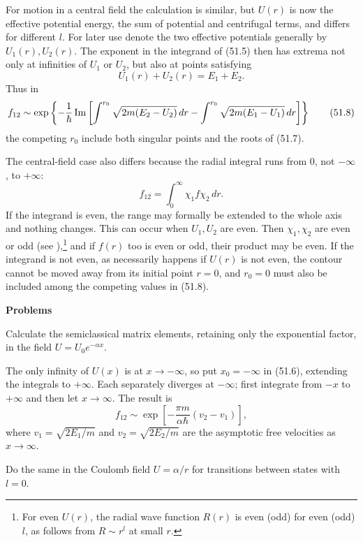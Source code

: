For motion in a central field the calculation is similar, but $U(r)$ is now
the effective potential energy, the sum of potential and centrifugal terms,
and differs for different $l$. For later use denote the two effective
potentials generally by $U_1(r),U_2(r)$. The exponent in the integrand of
(51.5) then has extrema not only at infinities of $U_1$ or $U_2$, but also at
points satisfying
\begin{equation}
 U_1(r)+U_2(r)=E_1+E_2. \tag{51.7}
\end{equation}
Thus in
\begin{equation}
 f_{12}\sim\exp\left\{-\frac1\hbar\mathop{\rm Im}\left[
 \int^{r_0}\sqrt{2m(E_2-U_2)}\,dr-
 \int^{r_0}\sqrt{2m(E_1-U_1)}\,dr\right]\right\} \tag{51.8}
\end{equation}
the competing $r_0$ include both singular points and the roots of (51.7).

The central-field case also differs because the radial integral runs from 0,
not $-\infty$, to $+\infty$:
\[
 f_{12}=\int_0^\infty\chi_1f\chi_2\,dr.
\]
If the integrand is even, the range may formally be extended to the whole
axis and nothing changes. This can occur when $U_1,U_2$ are even. Then
$\chi_1,\chi_2$ are even or odd (see ),\footnote{For even $U(r)$, the
radial wave function $R(r)$ is even (odd) for even (odd) $l$, as follows from
$R\sim r^l$ at small $r$.} and if $f(r)$ too is even or odd, their product may
be even. If the integrand is not even, as necessarily happens if $U(r)$ is
not even, the contour cannot be moved away from its initial point $r=0$, and
$r_0=0$ must also be included among the competing values in (51.8).

\begin{center}\textbf{Problems}\end{center}

 Calculate the semiclassical matrix elements, retaining
only the exponential factor, in the field $U=U_0e^{-\alpha x}$.

\SolutionHeading The only infinity of $U(x)$ is at $x\to-\infty$, so put
$x_0=-\infty$ in (51.6), extending the integrals to $+\infty$. Each separately
diverges at $-\infty$; first integrate from $-x$ to $+\infty$ and then let
$x\to\infty$. The result is
\[
 f_{12}\sim\exp\left[-\frac{\pi m}{\alpha\hbar}(v_2-v_1)\right],
\]
where $v_1=\sqrt{2E_1/m}$ and $v_2=\sqrt{2E_2/m}$ are the asymptotic free
velocities as $x\to\infty$.

 Do the same in the Coulomb field $U=\alpha/r$ for
transitions between states with $l=0$.

